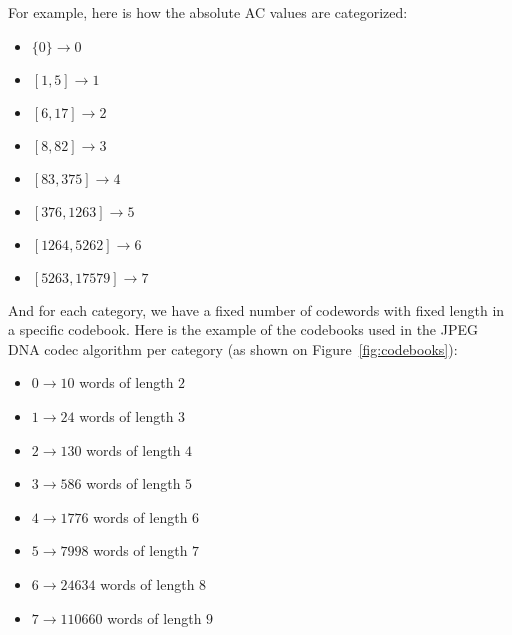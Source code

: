 For example, here is how the absolute AC values are categorized:

\begin{minipage}[t]{0.45\textwidth}
\begin{itemize}
    \item $\{0\} \rightarrow 0$
    \item $[1,5] \rightarrow 1$
    \item $[6,17] \rightarrow 2$
    \item $[8,82] \rightarrow 3$
\end{itemize}
\end{minipage}
\begin{minipage}[t]{0.45\textwidth}
\begin{itemize}
    \item $[83,375] \rightarrow 4$
    \item $[376,1263] \rightarrow 5$
    \item $[1264,5262] \rightarrow 6$
    \item $[5263,17579] \rightarrow 7$
\end{itemize}
\end{minipage}

And for each category, we have a fixed number of codewords with fixed length in a specific codebook. Here is the example of the codebooks used in the JPEG DNA codec algorithm per category (as shown on Figure~\ref{fig:codebooks}):

\begin{minipage}[t]{0.45\textwidth}
\begin{itemize}
        \item $0 \rightarrow 10$ words of length $2$ 
        \item $1 \rightarrow 24$ words of length $3$
        \item $2 \rightarrow 130$ words of length $4$
        \item $3 \rightarrow 586$ words of length $5$
\end{itemize}
\end{minipage}
\begin{minipage}[t]{0.45\textwidth}
\begin{itemize}
        \item $4 \rightarrow 1776$ words of length $6$
        \item $5 \rightarrow 7998$ words of length $7$
        \item $6 \rightarrow 24634$ words of length $8$
        \item $7 \rightarrow 110660$ words of length $9$
\end{itemize}
\end{minipage}

